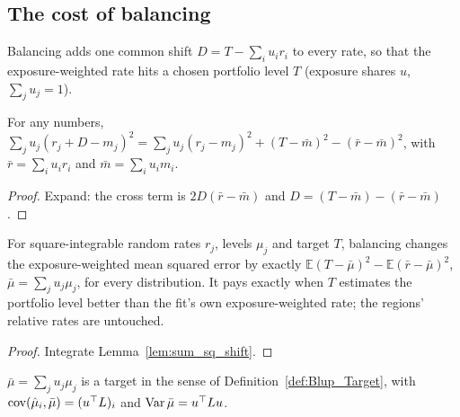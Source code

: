 \subsection*{The cost of balancing}

Balancing adds one common shift $D = T - \sum_i u_i r_i$ to every rate, so that the
exposure-weighted rate hits a chosen portfolio level $T$ (exposure shares $u$, $\sum_j u_j = 1$).

\begin{lemma}\label{lem:sum_sq_shift}
  \leanok
  For any numbers,
  $\sum_j u_j(r_j + D - m_j)^2 = \sum_j u_j(r_j - m_j)^2 + (T - \bar m)^2 - (\bar r - \bar m)^2$,
  with $\bar r = \sum_i u_ir_i$ and $\bar m = \sum_i u_im_i$.
\end{lemma}
\begin{proof}
  \leanok
  Expand: the cross term is $2D(\bar r - \bar m)$ and $D = (T - \bar m) - (\bar r - \bar m)$.
\end{proof}

\begin{theorem}\label{thm:balance_cost}
  \leanok
  For square-integrable random rates $r_j$, levels $\mu_j$ and target $T$, balancing changes the
  exposure-weighted mean squared error by exactly
  $\mathbb E(T - \bar\mu)^2 - \mathbb E(\bar r - \bar\mu)^2$, $\bar\mu = \sum_j u_j\mu_j$, for every
  distribution. It pays exactly when $T$ estimates the portfolio level better than the fit's own
  exposure-weighted rate; the regions' relative rates are untouched.
\end{theorem}
\begin{proof}
  \leanok
  Integrate Lemma~\ref{lem:sum_sq_shift}.
\end{proof}

\begin{definition}\label{def:Core_portTarget}
  \leanok
  $\bar\mu = \sum_j u_j\mu_j$ is a target in the sense of Definition~\ref{def:Blup_Target}, with
  $\operatorname{cov}(\hat\mu_i, \bar\mu) = (u^\top L)_i$ and $\operatorname{Var}\bar\mu = u^\top Lu$.
\end{definition}

